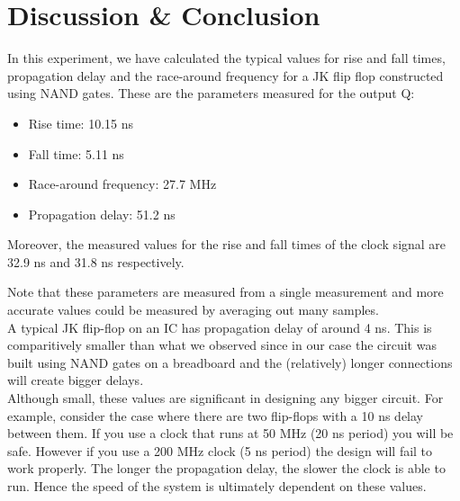\section{Discussion \& Conclusion}

In this experiment, we have calculated the typical values for rise and fall times, propagation delay and the race-around frequency for a JK flip flop constructed using NAND gates. These are the parameters measured for the output Q:\\

\begin{itemize}
    \item Rise time: 10.15 ns
    \item Fall time: 5.11 ns
    \item Race-around frequency: 27.7 MHz
    \item Propagation delay: 51.2 ns\\
\end{itemize}

Moreover, the measured values for the rise and fall times of the clock signal are 32.9 ns and 31.8 ns respectively.

Note that these parameters are measured from a single measurement and more accurate values could be measured by averaging out many samples.\\

A typical JK flip-flop on an IC has propagation delay of around 4 ns. This is comparitively smaller than what we observed since in our case the circuit was built using NAND gates on a breadboard and the (relatively) longer connections will create bigger delays.\\

Although small, these values are significant in designing any bigger circuit. For example, consider the case where there are two flip-flops with a 10 ns delay between them. If you use a clock that runs at 50 MHz (20 ns period) you will be safe. However if you use a 200 MHz clock (5 ns period) the design will fail to work properly. The longer the propagation delay, the slower the clock is able to run. Hence the speed of the system is ultimately dependent on these values.
